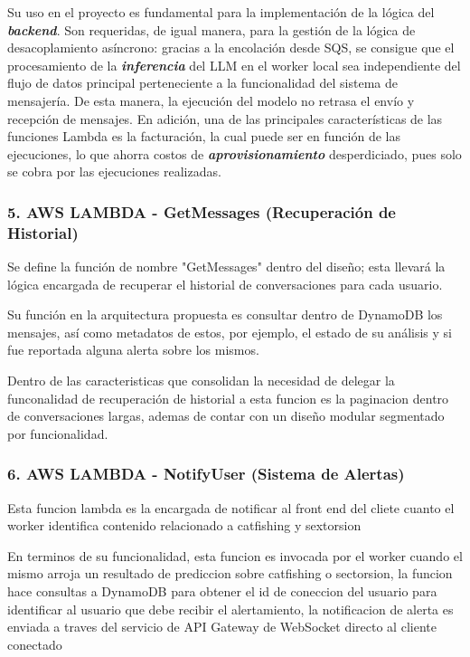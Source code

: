 Su uso en el proyecto es fundamental para la implementación de la lógica del \textbf{\textit{backend}}. Son requeridas, de igual manera, para la gestión de la lógica de desacoplamiento asíncrono: gracias a la encolación desde SQS, se consigue que el procesamiento de la \textbf{\textit{inferencia}} del LLM en el worker local sea independiente del flujo de datos principal perteneciente a la funcionalidad del sistema de mensajería. De esta manera, la ejecución del modelo no retrasa el envío y recepción de mensajes. En adición, una de las principales características de las funciones Lambda es la facturación, la cual puede ser en función de las ejecuciones, lo que ahorra costos de \textbf{\textit{aprovisionamiento}} desperdiciado, pues solo se cobra por las ejecuciones realizadas.

\subsubsection{5. AWS LAMBDA - GetMessages (Recuperación de Historial)}

Se define la función de nombre "GetMessages" dentro del diseño; esta llevará la lógica encargada de recuperar el historial de conversaciones para cada usuario.

Su función en la arquitectura propuesta es consultar dentro de DynamoDB los mensajes, así como metadatos de estos, por ejemplo, el estado de su análisis y si fue reportada alguna alerta sobre los mismos.

Dentro de las caracteristicas que consolidan la necesidad de delegar la funconalidad de recuperación de historial a esta funcion es la paginacion dentro de conversaciones largas, ademas de contar con un diseño modular segmentado por funcionalidad.

\subsubsection{6. AWS LAMBDA - NotifyUser (Sistema de Alertas)}

Esta funcion lambda es la encargada de notificar al front end del cliete cuanto el worker identifica contenido relacionado a catfishing y sextorsion  

En terminos de su funcionalidad, esta funcion es invocada por el worker cuando el mismo arroja un resultado de prediccion sobre catfishing o sectorsion, la funcion hace consultas a DynamoDB para obtener el id de coneccion del usuario para identificar al usuario que debe recibir el alertamiento, la notificacion de alerta es enviada a traves del servicio de API Gateway de WebSocket directo al cliente conectado

